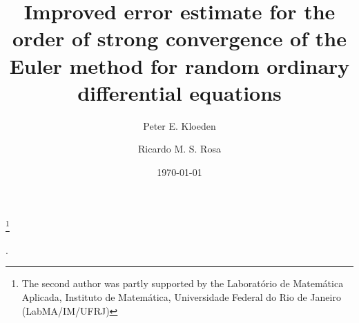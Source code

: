 \documentclass[reqno,12pt]{amsart}
\theoremstyle{plain} %
\theoremstyle{definition} %
\begin{document}


\title[Strong convergence of the Euler method for Random ODEs]{Improved error estimate for the order of strong convergence of the Euler method for random ordinary differential equations}

\author[P. E. Kloeden]{Peter E. Kloeden}
\author[R. M. S. Rosa]{Ricardo M. S. Rosa}

\address[Peter E. Kloeden]{Mathematics Department, University of T\"ubingen, Germany}
\address[Ricardo M. S. Rosa]{Instituto de Matem\'atica, Universidade Federal do Rio de Janeiro, Brazil}


\date{\today}

\thanks{The second author was partly supported by the Laborat\'orio de Matem\'atica Aplicada, Instituto de Matem\'atica, Universidade Federal do Rio de Janeiro (LabMA/IM/UFRJ)}

\makeatletter
{}
\makeatother
{}

.
\end{document}
